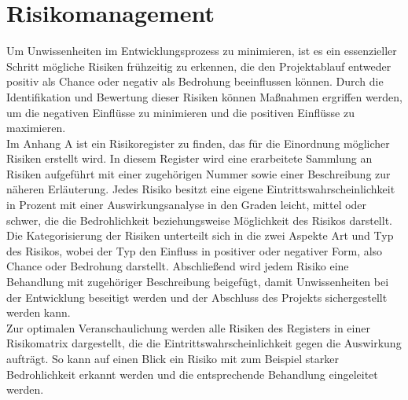 \chapter{Risikomanagement}\label{ch:risikomanagement}
Um Unwissenheiten im Entwicklungsprozess zu minimieren, ist es ein essenzieller Schritt mögliche Risiken frühzeitig 
zu erkennen, die den Projektablauf entweder positiv als Chance oder negativ als Bedrohung beeinflussen können.
Durch die Identifikation und Bewertung dieser Risiken können Maßnahmen ergriffen werden, um die negativen
Einflüsse zu minimieren und die positiven Einflüsse zu maximieren. \\
\newline
Im Anhang A ist ein Risikoregister zu finden, das für die Einordnung möglicher Risiken erstellt wird. 
In diesem Register wird eine erarbeitete Sammlung an Risiken aufgeführt mit einer zugehörigen Nummer sowie einer
Beschreibung zur näheren Erläuterung.
Jedes Risiko besitzt eine eigene Eintrittswahrscheinlichkeit in Prozent mit einer Auswirkungsanalyse in den Graden 
leicht, mittel oder schwer, die die Bedrohlichkeit beziehungsweise Möglichkeit des Risikos darstellt.
Die Kategorisierung der Risiken unterteilt sich in die zwei Aspekte Art und Typ des Risikos, wobei der Typ den Einfluss
in positiver oder negativer Form, also Chance oder Bedrohung darstellt.
Abschließend wird jedem Risiko eine Behandlung mit zugehöriger Beschreibung beigefügt, damit Unwissenheiten bei der 
Entwicklung beseitigt werden und der Abschluss des Projekts sichergestellt werden kann. \\
\newline
Zur optimalen Veranschaulichung werden alle Risiken des Registers in einer Risikomatrix dargestellt, die die
Eintrittswahrscheinlichkeit gegen die Auswirkung aufträgt.
So kann auf einen Blick ein Risiko mit zum Beispiel starker Bedrohlichkeit erkannt werden und die entsprechende 
Behandlung eingeleitet werden. \\